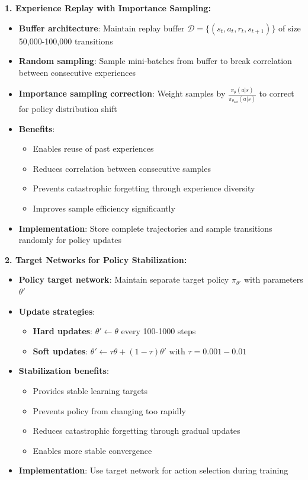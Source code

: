 \documentclass[12pt]{article}
\begin{document}
{{{\textbf{1. Experience Replay with Importance Sampling:}
\begin{itemize}
    \item \textbf{Buffer architecture}: Maintain replay buffer $\mathcal{D} = \{(s_t, a_t, r_t, s_{t+1})\}$ of size 50,000-100,000 transitions
    \item \textbf{Random sampling}: Sample mini-batches from buffer to break correlation between consecutive experiences
    \item \textbf{Importance sampling correction}: Weight samples by $\frac{\pi_\theta(a|s)}{\pi_{\theta_{old}}(a|s)}$ to correct for policy distribution shift
    \item \textbf{Benefits}: 
    \begin{itemize}
        \item Enables reuse of past experiences
        \item Reduces correlation between consecutive samples
        \item Prevents catastrophic forgetting through experience diversity
        \item Improves sample efficiency significantly
    \end{itemize}
    \item \textbf{Implementation}: Store complete trajectories and sample transitions randomly for policy updates
\end{itemize}

\textbf{2. Target Networks for Policy Stabilization:}
\begin{itemize}
    \item \textbf{Policy target network}: Maintain separate target policy $\pi_{\theta'}$ with parameters $\theta'$
    \item \textbf{Update strategies}:
    \begin{itemize}
        \item \textbf{Hard updates}: $\theta' \leftarrow \theta$ every 100-1000 steps
        \item \textbf{Soft updates}: $\theta' \leftarrow \tau\theta + (1-\tau)\theta'$ with $\tau = 0.001-0.01$
    \end{itemize}
    \item \textbf{Stabilization benefits}:
    \begin{itemize}
        \item Provides stable learning targets
        \item Prevents policy from changing too rapidly
        \item Reduces catastrophic forgetting through gradual updates
        \item Enables more stable convergence
    \end{itemize}
    \item \textbf{Implementation}: Use target network for action selection during training
\end{itemize}

}}}
\end{document}
